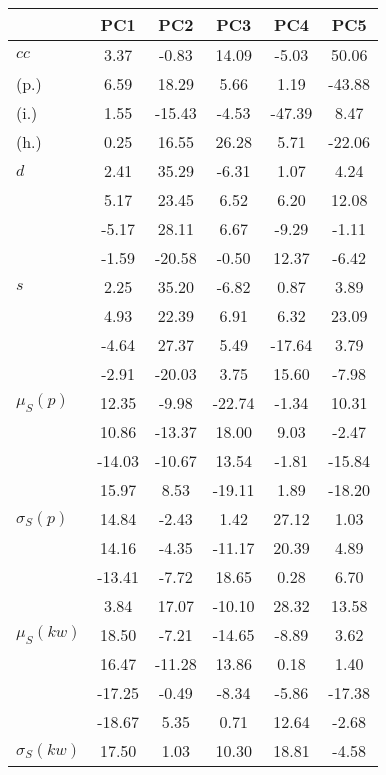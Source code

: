 \begin{table}[h!]
\begin{center}
\begin{tabular}{| l | c | c | c | c | c |}\hline
 & PC1 & PC2 & PC3 & PC4 & PC5 \\\hline
$cc$ & 3.37  & -0.83  & 14.09  & -5.03  & 50.06 \\\hline
(p.) & 6.59  & 18.29  & 5.66  & 1.19  & -43.88 \\\hline
(i.) & 1.55  & -15.43  & -4.53  & -47.39  & 8.47 \\\hline
(h.) & 0.25  & 16.55  & 26.28  & 5.71  & -22.06 \\\hline
$d$ & 2.41  & 35.29  & -6.31  & 1.07  & 4.24 \\\hline
 & 5.17  & 23.45  & 6.52  & 6.20  & 12.08 \\\hline
 & -5.17  & 28.11  & 6.67  & -9.29  & -1.11 \\\hline
 & -1.59  & -20.58  & -0.50  & 12.37  & -6.42 \\\hline
$s$ & 2.25  & 35.20  & -6.82  & 0.87  & 3.89 \\\hline
 & 4.93  & 22.39  & 6.91  & 6.32  & 23.09 \\\hline
 & -4.64  & 27.37  & 5.49  & -17.64  & 3.79 \\\hline
 & -2.91  & -20.03  & 3.75  & 15.60  & -7.98 \\\hline
$\mu_S(p)$ & 12.35  & -9.98  & -22.74  & -1.34  & 10.31 \\\hline
 & 10.86  & -13.37  & 18.00  & 9.03  & -2.47 \\\hline
 & -14.03  & -10.67  & 13.54  & -1.81  & -15.84 \\\hline
 & 15.97  & 8.53  & -19.11  & 1.89  & -18.20 \\\hline
$\sigma_S(p)$ & 14.84  & -2.43  & 1.42  & 27.12  & 1.03 \\\hline
 & 14.16  & -4.35  & -11.17  & 20.39  & 4.89 \\\hline
 & -13.41  & -7.72  & 18.65  & 0.28  & 6.70 \\\hline
 & 3.84  & 17.07  & -10.10  & 28.32  & 13.58 \\\hline
$\mu_S(kw)$ & 18.50  & -7.21  & -14.65  & -8.89  & 3.62 \\\hline
 & 16.47  & -11.28  & 13.86  & 0.18  & 1.40 \\\hline
 & -17.25  & -0.49  & -8.34  & -5.86  & -17.38 \\\hline
 & -18.67  & 5.35  & 0.71  & 12.64  & -2.68 \\\hline
$\sigma_S(kw)$ & 17.50  & 1.03  & 10.30  & 18.81  & -4.58 \\\hline

\end{tabular}
\end{center}
\end{table}
